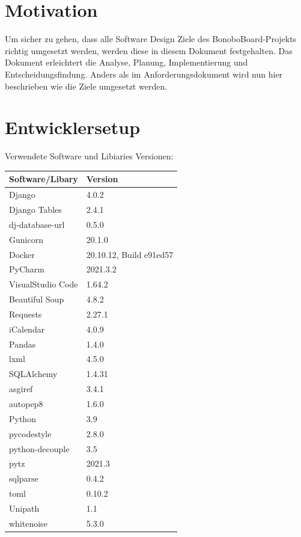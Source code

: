 \documentclass[a4paper,11pt]{scrartcl}
\begin{document}



\section{Motivation}
Um sicher zu gehen, dass alle Software Design Ziele des BonoboBoard-Projekts richtig umgesetzt werden, werden diese in diesem Dokument festgehalten. Das Dokument erleichtert die Analyse, Planung, Implementierung und Entscheidungsfindung. Anders als im Anforderungsdokument wird nun hier beschrieben wie die Ziele umgesetzt werden. 

\section{Entwicklersetup}
Verwendete Software und Libiaries Versionen:
\begin{table}[H]
\begin{tabular}{|p{5cm}|p{5cm}|}
\hline
\textbf{Software/Libary} & \textbf{Version} \\ \hline
	Django &  4.0.2\\ \hline
	Django Tables & 2.4.1 \\ \hline
	dj-database-url & 0.5.0 \\ \hline
	Gunicorn & 20.1.0 \\ \hline
	Docker & 20.10.12, Build e91ed57 \\ \hline
	PyCharm & 2021.3.2 \\ \hline
	VisualStudio Code & 1.64.2 \\ \hline
	Beautiful Soup & 4.8.2 \\ \hline
	Requests & 2.27.1 \\ \hline
	iCalendar & 4.0.9 \\ \hline
	Pandas & 1.4.0 \\ \hline
	lxml & 4.5.0 \\ \hline
	SQLAlchemy & 1.4.31 \\ \hline
	asgiref & 3.4.1 \\ \hline
	autopep8 & 1.6.0 \\ \hline
	Python & 3.9 \\ \hline
	pycodestyle & 2.8.0 \\ \hline
	python-decouple & 3.5 \\ \hline
	pytz & 2021.3 \\ \hline
	sqlparse & 0.4.2 \\ \hline
	toml & 0.10.2 \\ \hline
	Unipath & 1.1 \\ \hline
	whitenoise & 5.3.0 \\ \hline
\end{tabular}
\end{table}
\end{document}
